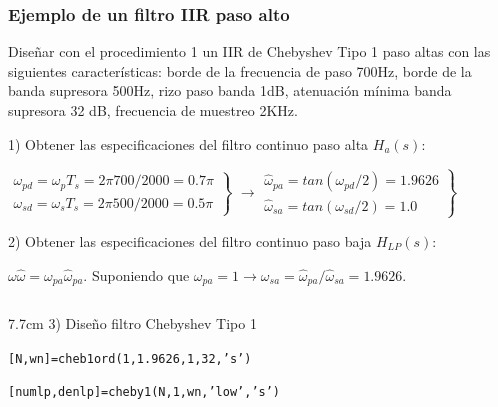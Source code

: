 \documentclass[handout]{beamer}
\numberwithin{section}{part}
\begin{document}
\begin{frame}
\frametitle{Ejemplo de un filtro  IIR  paso alto}
\footnotesize

\footnotesize
\color{olivegreen} Diseñar con el procedimiento 1 un IIR de Chebyshev Tipo 1 paso altas con las siguientes características: borde de la frecuencia de paso 700Hz, borde de la banda supresora 500Hz, rizo paso banda 1dB, atenuación mínima banda supresora 32 dB, frecuencia de muestreo 2KHz.
\color{gray}
\vspace{0.1cm}

1)  Obtener las especificaciones del filtro continuo paso alta $H_a(s)$:

$\left . \begin{array}{l}\omega_{pd}=\omega_pT_s=2\pi 700/2000=0.7\pi\\\omega_{sd}=\omega_sT_s=2\pi 500/2000=0.5\pi\end{array}\right \}$ $\rightarrow \left . \begin{array}{l}\hat \omega_{pa}=tan(\omega_{pd}/2)=1.9626\\\hat \omega_{sa}=tan(\omega_{sd}/2)=1.0\end{array}\right \}$

\vspace{0.1cm}

2) Obtener las especificaciones del filtro continuo paso baja $H_{LP}(s)$:

\vspace{0.1cm}


\hspace{0.25cm}$\omega\hat \omega=\omega_{pa}\hat \omega_{pa}$. Suponiendo que $\omega_{pa}=1 \rightarrow \omega_{sa}=\hat \omega_{pa}/\hat \omega_{sa}=1.9626$.

\vspace{0.1cm}

\begin{columns}[T]
 \hspace{0.2cm}\begin{column}{7.7cm}
3) Diseño filtro Chebyshev Tipo 1

\vspace{0.1cm}

\hspace{0.25cm}\texttt{[N,wn]=cheb1ord(1,1.9626,1,32,'s')}

\hspace{0.25cm}\texttt{[numlp,denlp]=cheby1(N,1,wn,'low','s')}

\vspace{0.1cm}


\end{column}
\end{columns}
\end{frame}
\end{document}
